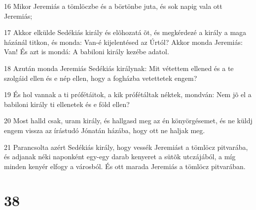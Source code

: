 \par 16 Mikor Jeremiás a tömlöczbe és a börtönbe juta, és sok napig vala ott Jeremiás;
\par 17 Akkor elkülde Sedékiás király és elõhozatá õt, és megkérdezé a király a maga házánál titkon, és monda: Van-é kijelentésed az Úrtól? Akkor monda Jeremiás: Van! És azt is mondá: A babiloni király kezébe adatol.
\par 18 Azután monda Jeremiás Sedékiás királynak: Mit vétettem ellened és a te szolgáid ellen és e nép ellen, hogy a fogházba vetettetek engem?
\par 19 És hol vannak a ti prófétáitok, a kik prófétáltak néktek, mondván: Nem jõ el a babiloni király ti ellenetek és e föld ellen?
\par 20 Most halld csak, uram király, és hallgasd meg az én könyörgésemet, és ne küldj engem vissza az írástudó Jónatán házába, hogy ott ne haljak meg.
\par 21 Parancsolta azért Sedékiás király, hogy vessék Jeremiást a tömlöcz pitvarába, és adjanak néki naponként egy-egy darab kenyeret a sütõk utczájából, a míg minden kenyér elfogy a városból. És ott marada Jeremiás a tömlöcz pitvarában.

\chapter{38}

